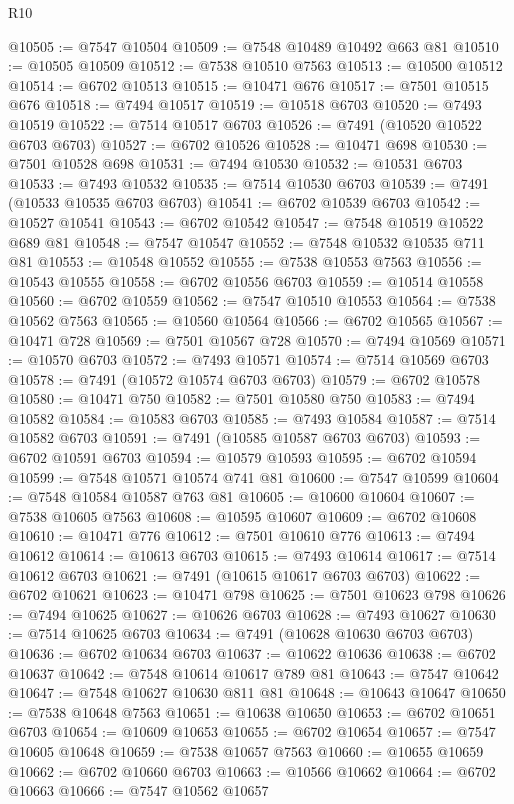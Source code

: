 \begin{lexlean}{R10}
\begin{coremodule}
@10505 := @7547 @10504
@10509 := @7548 @10489 @10492 @663 @81
@10510 := @10505 @10509
@10512 := @7538 @10510 @7563
@10513 := @10500 @10512
@10514 := @6702 @10513
@10515 := @10471 @676
@10517 := @7501 @10515 @676
@10518 := @7494 @10517
@10519 := @10518 @6703
@10520 := @7493 @10519
@10522 := @7514 @10517 @6703
@10526 := @7491 (@10520 @10522 @6703 @6703)
@10527 := @6702 @10526
@10528 := @10471 @698
@10530 := @7501 @10528 @698
@10531 := @7494 @10530
@10532 := @10531 @6703
@10533 := @7493 @10532
@10535 := @7514 @10530 @6703
@10539 := @7491 (@10533 @10535 @6703 @6703)
@10541 := @6702 @10539 @6703
@10542 := @10527 @10541
@10543 := @6702 @10542
@10547 := @7548 @10519 @10522 @689 @81
@10548 := @7547 @10547
@10552 := @7548 @10532 @10535 @711 @81
@10553 := @10548 @10552
@10555 := @7538 @10553 @7563
@10556 := @10543 @10555
@10558 := @6702 @10556 @6703
@10559 := @10514 @10558
@10560 := @6702 @10559
@10562 := @7547 @10510 @10553
@10564 := @7538 @10562 @7563
@10565 := @10560 @10564
@10566 := @6702 @10565
@10567 := @10471 @728
@10569 := @7501 @10567 @728
@10570 := @7494 @10569
@10571 := @10570 @6703
@10572 := @7493 @10571
@10574 := @7514 @10569 @6703
@10578 := @7491 (@10572 @10574 @6703 @6703)
@10579 := @6702 @10578
@10580 := @10471 @750
@10582 := @7501 @10580 @750
@10583 := @7494 @10582
@10584 := @10583 @6703
@10585 := @7493 @10584
@10587 := @7514 @10582 @6703
@10591 := @7491 (@10585 @10587 @6703 @6703)
@10593 := @6702 @10591 @6703
@10594 := @10579 @10593
@10595 := @6702 @10594
@10599 := @7548 @10571 @10574 @741 @81
@10600 := @7547 @10599
@10604 := @7548 @10584 @10587 @763 @81
@10605 := @10600 @10604
@10607 := @7538 @10605 @7563
@10608 := @10595 @10607
@10609 := @6702 @10608
@10610 := @10471 @776
@10612 := @7501 @10610 @776
@10613 := @7494 @10612
@10614 := @10613 @6703
@10615 := @7493 @10614
@10617 := @7514 @10612 @6703
@10621 := @7491 (@10615 @10617 @6703 @6703)
@10622 := @6702 @10621
@10623 := @10471 @798
@10625 := @7501 @10623 @798
@10626 := @7494 @10625
@10627 := @10626 @6703
@10628 := @7493 @10627
@10630 := @7514 @10625 @6703
@10634 := @7491 (@10628 @10630 @6703 @6703)
@10636 := @6702 @10634 @6703
@10637 := @10622 @10636
@10638 := @6702 @10637
@10642 := @7548 @10614 @10617 @789 @81
@10643 := @7547 @10642
@10647 := @7548 @10627 @10630 @811 @81
@10648 := @10643 @10647
@10650 := @7538 @10648 @7563
@10651 := @10638 @10650
@10653 := @6702 @10651 @6703
@10654 := @10609 @10653
@10655 := @6702 @10654
@10657 := @7547 @10605 @10648
@10659 := @7538 @10657 @7563
@10660 := @10655 @10659
@10662 := @6702 @10660 @6703
@10663 := @10566 @10662
@10664 := @6702 @10663
@10666 := @7547 @10562 @10657

\end{coremodule}
\end{lexlean}
